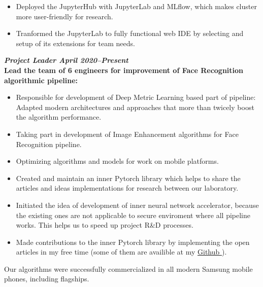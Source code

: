 \documentclass[10pt,a4paper,sans]{moderncv}
\begin{document}
\begin{itemize}
{{\begin{itemize}
	\item Deployed the JupyterHub with JupyterLab and MLflow, which makes cluster more user-friendly for research.
	\item Tranformed the JupyterLab to fully functional web IDE by selecting and setup of its extensions for team needs.
\end{itemize}
\vspace{10pt}
\normalsize{\textbf{\textit{Project Leader \hfill April 2020--Present}}} \\
\small{\textbf{Lead the team of 6 engineers for improvement of Face Recognition algorithmic pipeline:}} \\
\begin{itemize}
	\item Responsible for development of Deep Metric Learning based part of pipeline: Adapted modern architectures and approaches that more than twicely boost the algorithm performance.
	\item Taking part in development of Image Enhancement algorithms for Face Recognition pipeline. 
	\item Optimizing algorithms and models for work on mobile platforms.
	\item Created and maintain an inner Pytorch library which helps to share the articles and ideas implementations for research between our laboratory.
	\item Initiated the idea of development of inner neural network accelerator, because the existing ones are not applicable to secure enviroment where all pipeline works. This helps us to speed up project R\&D processes.
	\item Made contributions to the inner Pytorch library by implementing the open articles in my free time (some of them are availible at my \href{https://github.com/DeadAt0m}{Github \faGithub}).
\end{itemize}
\vspace{4pt}
Our algorithms were successfully commercialized in all modern Samsung mobile phones, including flagships.
}}
\vspace{6pt}


\end{itemize}
\end{document}

